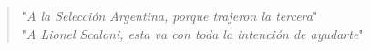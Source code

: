 \vspace*{\fill}
\begin{center}
\begin{quote}
\begin{flushright}
  "\textit{A la Selección Argentina, porque trajeron la tercera}" \\
  "\textit{A Lionel Scaloni, esta va con toda la intención de ayudarte}" \\
\end{flushright}
\end{quote}
\end{center}
\vspace*{\fill}
